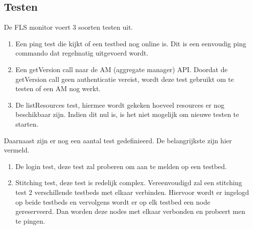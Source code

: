 \subsection{Testen}
\npar
De FLS monitor voert 3 soorten testen uit.
\begin{enumerate}
\item Een ping test die kijkt of een testbed nog online is. Dit is een eenvoudig ping commando dat regelmatig uitgevoerd wordt. 
\item Een getVersion call naar de AM (aggregate manager) API. Doordat de getVersion call geen authenticatie vereist, wordt deze test gebruikt om te testen of een AM nog werkt.
\item De listResources test, hiermee wordt gekeken hoeveel resources er nog beschikbaar zijn. Indien dit nul is, is het niet mogelijk om nieuwe testen te starten.
\end{enumerate}
\npar
Daarnaast zijn er nog een aantal test gedefinieerd. De belangrijkste zijn hier vermeld.
\begin{enumerate}
\item De login test, deze test zal proberen om aan te melden op een testbed.
\item Stitching test, deze test is redelijk complex. Vereenvoudigd zal een stitching test 2 verschillende testbeds met elkaar verbinden. Hiervoor wordt er ingelogd op beide testbeds en vervolgens wordt er op elk testbed een node gereserveerd. Dan worden deze nodes met elkaar verbonden en probeert men te pingen. 
\end{enumerate}
\clearpage
